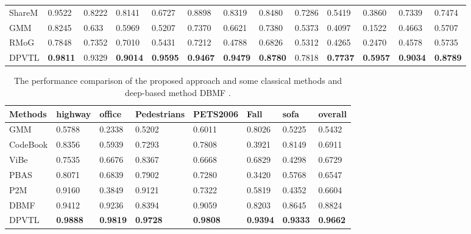 \documentclass[journal]{IEEEtran}
\begin{document}
\begin{table}[!t]
\begin{tabular}{lllllllllllll}
ShareM\cite{2015_ICME_ShareModel}      & 0.9522   & 0.8222  & 0.8141     & 0.6727    & 0.8898 & 0.8319  & 0.8480   & 0.7286     & 0.5419     & 0.3860 & 0.7339  & 0.7474  \\
GMM\cite{Zivkovic2004}         & 0.8245   & 0.633   & 0.5969     & 0.5207    & 0.7370 & 0.6621  & 0.7380   & 0.5373     & 0.4097     & 0.1522 & 0.4663  & 0.5707  \\
RMoG\cite{Varadarajan2013}        & 0.7848   & 0.7352  & 0.7010     & 0.5431    & 0.7212 & 0.4788  & 0.6826   & 0.5312     & 0.4265     & 0.2470 & 0.4578  & 0.5735  \\ \hline
DPVTL        & \textbf{0.9811}   & 0.9329  & \textbf{0.9014}     & \textbf{0.9595}    & \textbf{0.9467} & \textbf{0.9479}  & \textbf{0.8780}   & 0.7818     & \textbf{0.7737}     & \textbf{0.5957} & \textbf{0.9034}  & \textbf{0.8789} \\ \hline
\end{tabular}
\end{table}

\begin{table}[!t]
\centering
\caption{The performance comparison of the proposed approach and some classical methods and deep-based method DBMF .}
\label{tab2}
\begin{tabular}{llllllll}
\hline
Methods  & highway & office & Pedestrians & PETS2006 & Fall   & sofa   & overall \\ \hline
GMM\cite{Stauffer1999}      & 0.5788  & 0.2338 & 0.5202      & 0.6011   & 0.8026 & 0.5225 & 0.5432  \\
CodeBook\cite{WU2010739} & 0.8356  & 0.5939 & 0.7293      & 0.7808   & 0.3921 & 0.8149 & 0.6911  \\
ViBe\cite{Barnich2011_2011_TIP}     & 0.7535  & 0.6676 & 0.8367      & 0.6668   & 0.6829 & 0.4298 & 0.6729  \\
PBAS\cite{Hofmann2012Background}     & 0.8071  & 0.6839 & 0.7902      & 0.7280   & 0.3420 & 0.5768 & 0.6547  \\
P2M\cite{Yang2016P2M}      & 0.9160  & 0.3849 & 0.9121      & 0.7322   & 0.5819 & 0.4352 & 0.6604  \\
DBMF\cite{Yang2018DBMF}     & 0.9412  & 0.9236 & 0.8394      & 0.9059   & 0.8203 & 0.8645 & 0.8824  \\ \hline
DPVTL     & \textbf{0.9888}  & \textbf{0.9819} & \textbf{0.9728}      & \textbf{0.9808}   & \textbf{0.9394} & \textbf{0.9333} & \textbf{0.9662}  \\ \hline
\end{tabular}
\end{table}
\end{document}
